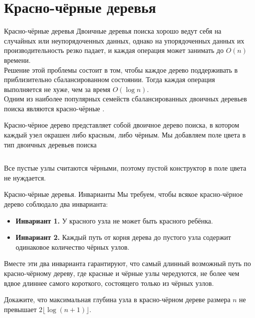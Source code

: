 
\fi

\section{Красно-чёрные деревья}
\label{sc:3.3}

\begin{frame}[fragile]{Красно-чёрные деревья}
Двоичные деревья поиска хорошо ведут себя на случайных или неупорядоченных данных,
однако на упорядоченных данных их производительность резко падает, и
каждая операция может занимать до $O(n)$  времени. \\

 Решение этой
проблемы состоит в том, чтобы каждое дерево поддерживать в
приблизительно сбалансированном состоянии. Тогда каждая операция
выполняется не хуже, чем за время $O(\log n)$. \\

 Одним из наиболее
популярных семейств сбалансированных двоичных деревьев поиска являются
красно-чёрные \cite{GuibasSedgewick1978}.
\end{frame}

\begin{frame}[fragile]{}
Красно-чёрное дерево представляет собой двоичное дерево поиска, в
котором каждый узел окрашен либо красным, либо чёрным. Мы добавляем
поле цвета в тип двоичных деревьев поиска %

\inputminted[firstline=6,lastline=7] {haskell}{code/RedBlackSet.lhs}
Все пустые узлы считаются чёрными, поэтому пустой конструктор
 в поле цвета не нуждается.

\end{frame}

\begin{frame}[fragile]{Красно-чёрные деревья. Инварианты}
Мы требуем, чтобы всякое красно-чёрное дерево соблюдало два
инварианта:
\begin{itemize}
  \item \textbf{Инвариант 1.} У красного узла не может быть красного ребёнка.
  \item \textbf{Инвариант 2.} Каждый путь от корня дерева до пустого
  узла содержит одинаковое количество чёрных узлов.
\end{itemize}
Вместе эти два инварианта гарантируют, что самый длинный возможный
путь по красно-чёрному дереву, где красные и чёрные узлы чередуются,
не более чем вдвое длиннее самого короткого, состоящего только из
чёрных узлов.

\ifanswers
\begin{exercise}\label{ex:3.8}
  Докажите, что максимальная глубина узла в красно-чёрном дереве
  размера $n$ не превышает $2 \lfloor \log (n+1) \rfloor$.
\end{exercise}
\fi
\end{frame}

